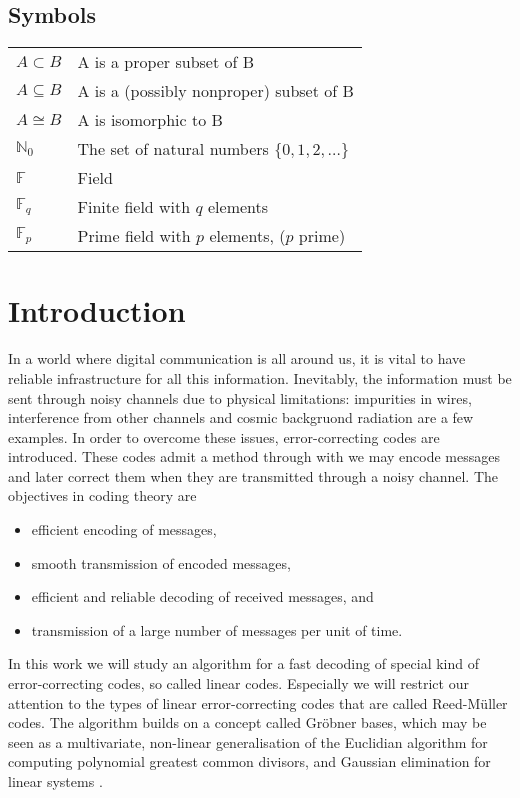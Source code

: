 \documentclass[english,bachelor]{liumaiex}
\begin{document}
\section*{Symbols}
\begin{tabular}{l l}
$A \subset B$ & A is a proper subset of B \\
$A \subseteq B$ & A is a (possibly nonproper) subset of B \\
$A \cong B$ & A is isomorphic to B \\
$\mathbb{N}_0$ & The set of natural numbers $\{0,1,2,\dots\}$ \\
$\mathbb{F}$ & Field \\
$\mathbb{F}_q$ & Finite field with $q$ elements \\
$\mathbb{F}_p$ & Prime field with $p$ elements, ($p$ prime)
\end{tabular}


\tableofcontents



\mainmatter

\chapter{Introduction}
In a world where digital communication is all around us, it is vital to have reliable infrastructure for all this information. Inevitably, the information must be sent through noisy channels due to physical limitations: impurities in wires, interference from other channels and cosmic backgruond radiation are a few examples. In order to overcome these issues, error-correcting codes are introduced. These codes admit a method through with we may encode messages and later correct them when they are transmitted through a noisy channel. The objectives in coding theory are
\begin{itemize}
\item efficient encoding of messages,
\item smooth transmission of encoded messages,
\item efficient and reliable decoding of received messages, and
\item transmission of a large number of messages per unit of time.
\end{itemize}
In this work we will study an algorithm for a fast decoding of special kind of error-correcting codes, so called linear codes. Especially we will restrict our attention to the types of linear error-correcting codes that are called Reed-M{\"u}ller codes. The algorithm builds on a concept called Gröbner bases, which may be seen as a multivariate, non-linear generalisation of the Euclidian algorithm for computing polynomial greatest common divisors, and Gaussian elimination for linear systems \cite{lazard83}.
\end{document}
